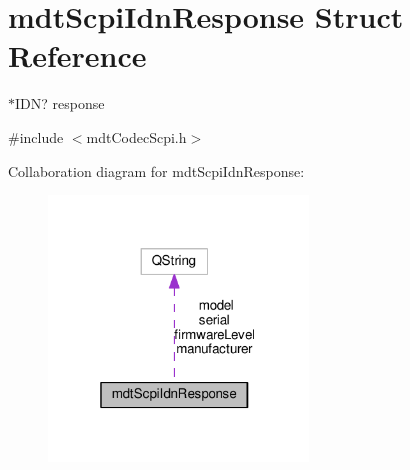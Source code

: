 \hypertarget{structmdt_scpi_idn_response}{\section{mdt\-Scpi\-Idn\-Response Struct Reference}
\label{structmdt_scpi_idn_response}
}


$\ast$\-I\-D\-N? response  




{\ttfamily \#include $<$mdt\-Codec\-Scpi.\-h$>$}



Collaboration diagram for mdt\-Scpi\-Idn\-Response\-:
\nopagebreak
\begin{figure}[H]
\begin{center}
\leavevmode
\includegraphics[width=196pt]{structmdt_scpi_idn_response__coll__graph}
\end{center}
\end{figure}
